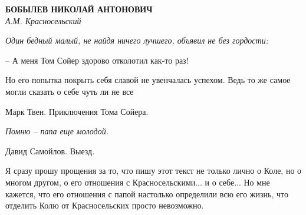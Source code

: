 \begin{center}{ \bf  БОБЫЛЕВ НИКОЛАЙ АНТОНОВИЧ}\\
{\it А.М. Красносельский} \\
\end{center}

\begin{flushright}
{\it Один бедный малый, не найдя ничего лучшего, объявил не без гордости:

 – А меня Том Сойер здорово отколотил как-то раз!

 Но его попытка покрыть себя  славой  не  увенчалась успехом. Ведь то же
 самое могли сказать о себе чуть ли не все }

Марк Твен. Приключения Тома Сойера.

{\it Помню – папа еще молодой.}

Давид Самойлов. Выезд.
\end{flushright}

Я сразу прошу прощения  за то, что пишу этот текст не только лично о Коле, но о многом другом, о его отношения с Красносельскими... и о себе... Но мне кажется, что его отношения с папой настолько определили всю его жизнь, что отделить Колю от Красносельских просто невозможно.

